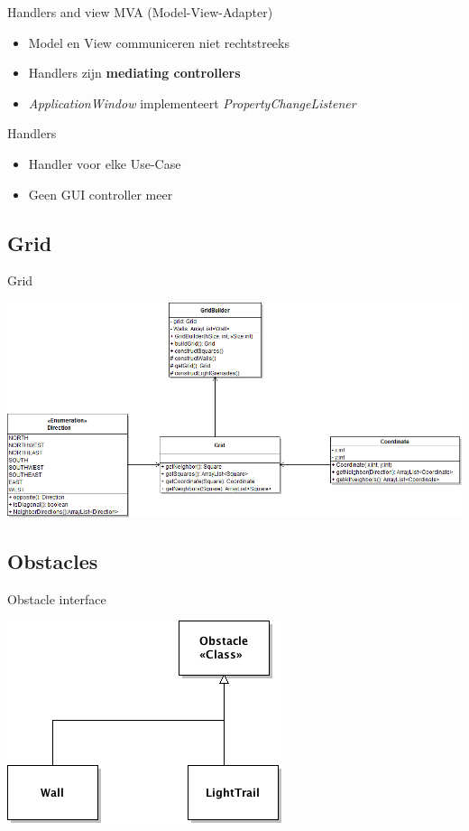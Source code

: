 \documentclass[t]{beamer}
\begin{document}
\begin{frame}{Handlers and view}
MVA (Model-View-Adapter) 
\begin{itemize}
	\item Model en View communiceren niet rechtstreeks
	\item Handlers zijn \textbf{mediating controllers}
	\item \textit{ApplicationWindow} implementeert \textit{PropertyChangeListener}
\end{itemize}
Handlers
\begin{itemize}
	\item Handler voor elke Use-Case
	\item Geen GUI controller meer
\end{itemize}
\end{frame}

\subsection{Grid}
\begin{frame}{Grid}
\begin{center}
\includegraphics[width=\linewidth]{images/GridClass}
\end{center}
\end{frame}


\subsection{Obstacles}
\begin{frame}{Obstacle interface}
\begin{center}
\includegraphics[width=0.50\linewidth]{images/obstacleinterface}
\end{center}
\end{frame}
\end{document}

